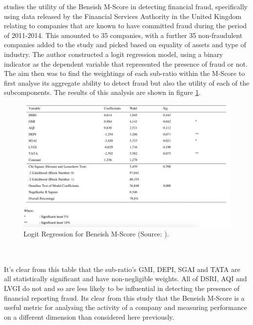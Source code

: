 {\cite{herawatiBeneish} studies the utility of the Beneish M-Score in detecting financial fraud, specifically using data released by the Financial Services Authority in the United Kingdom relating to companies that are known to have committed fraud during the period of 2011-2014. This amounted to 35 companies, with a further 35 non-fraudulent companies added to the study and picked based on equality of assets and type of industry. The author constructed a logit regression model, using a binary indicator as the dependent variable that represented the presence of fraud or not. The aim then was to find the weightings of each sub-ratio within the M-Score to first analyse its aggregate ability to detect fraud but also the utility of each of the subcomponents. The results of this analysis are shown in figure \ref{beneish_comp}. 
\begin{figure}[h] \label{logitBeneish}
\centering
\includegraphics[scale = 0.65, angle =90]{images/litReview/beneish_comp.png}
\caption{Logit Regression for Beneish M-Score (Source: \cite{herawatiBeneish}).}
\label{beneish_comp}
\end{figure}\\\\
It's clear from this table that the sub-ratio's GMI, DEPI, SGAI and TATA are all statistically significant and have non-negligible weights. All of DSRI, AQI and LVGI do not and so are less likely to be influential in detecting the presence of financial reporting fraud. Its clear from this study that the Beneish M-Score is a useful metric for analysing the activity of a company and measuring performance on a different dimension than considered here previously.  }\\\\
\clearpage

